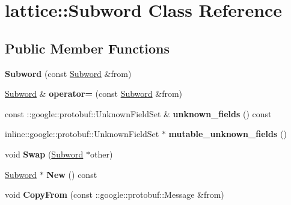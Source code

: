 \hypertarget{classlattice_1_1Subword}{
\section{lattice::Subword Class Reference}
\label{classlattice_1_1Subword}
}
\subsection*{Public Member Functions}
\begin{DoxyCompactItemize}
\item 
\hypertarget{classlattice_1_1Subword_aa0e10ac48dd649a4dddf8e1a6ef9b810}{
{\bfseries Subword} (const \hyperlink{classlattice_1_1Subword}{Subword} \&from)}
\label{classlattice_1_1Subword_aa0e10ac48dd649a4dddf8e1a6ef9b810}

\item 
\hypertarget{classlattice_1_1Subword_a102d4bfb0a00050e86aa85c3d8d1ef20}{
\hyperlink{classlattice_1_1Subword}{Subword} \& {\bfseries operator=} (const \hyperlink{classlattice_1_1Subword}{Subword} \&from)}
\label{classlattice_1_1Subword_a102d4bfb0a00050e86aa85c3d8d1ef20}

\item 
\hypertarget{classlattice_1_1Subword_aff470f65348c81181cffe6659c9e3d17}{
const ::google::protobuf::UnknownFieldSet \& {\bfseries unknown\_\-fields} () const }
\label{classlattice_1_1Subword_aff470f65348c81181cffe6659c9e3d17}

\item 
\hypertarget{classlattice_1_1Subword_a1fc937024a7c533e1c51d7adedffa24d}{
inline::google::protobuf::UnknownFieldSet $\ast$ {\bfseries mutable\_\-unknown\_\-fields} ()}
\label{classlattice_1_1Subword_a1fc937024a7c533e1c51d7adedffa24d}

\item 
\hypertarget{classlattice_1_1Subword_aac745475adf60d00b6f8f37c69f443b0}{
void {\bfseries Swap} (\hyperlink{classlattice_1_1Subword}{Subword} $\ast$other)}
\label{classlattice_1_1Subword_aac745475adf60d00b6f8f37c69f443b0}

\item 
\hypertarget{classlattice_1_1Subword_a7f70ea1b9d769fad4084e7d84c8da81c}{
\hyperlink{classlattice_1_1Subword}{Subword} $\ast$ {\bfseries New} () const }
\label{classlattice_1_1Subword_a7f70ea1b9d769fad4084e7d84c8da81c}

\item 
\hypertarget{classlattice_1_1Subword_ab08febfe342e4382de8d9d42142b87b4}{
void {\bfseries CopyFrom} (const ::google::protobuf::Message \&from)}
\label{classlattice_1_1Subword_ab08febfe342e4382de8d9d42142b87b4}


\end{DoxyCompactItemize}
